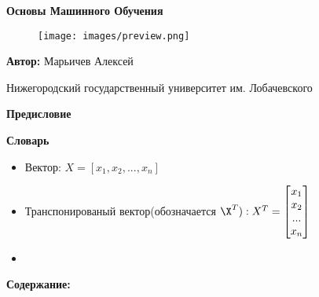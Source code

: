 \documentclass[a4paper,12pt]{article} %
\begin{document}
\begin{titlepage}
    \centering
    \vspace{2cm}

    {\Huge \textbf{Основы Машинного Обучения} \par}
    \vspace{1cm}


    \begin{figure}[htbp]
        \centering
        \texttt{[image: images/preview.png]}
        \label{fig:example}
    \end{figure}
    \vspace{5cm}

    \begin{flushright}
    \textbf{Автор:} Марьичев Алексей \\
    \vspace{3cm}
    \centering
    {\large Нижегородский государственный университет им. Лобачевского\par}
    \end{flushright}

\end{titlepage}

\newpage
\centering
{\Huge \textbf{Предисловие}}

\newpage
\centering
{\Huge \textbf{Словарь}} \\
\begin{itemize}

\vspace{1.3cm}
\item Вектор: \(X = [x_1, x_2, ..., x_n]\)
\item Транспонированый вектор(обозначается \(\X^T): X^T = \begin{bmatrix}
                                                    x_1 \\
                                                     x_2 \\
                                                     ... \\
                                                     x_n \\
\end{bmatrix} \)
    \item

\end{itemize}

\newpage
    \centering
    {\Huge \textbf{Содержание:}}


\newpage


\newpage


\newpage


\newpage


\newpage

\end{document}
